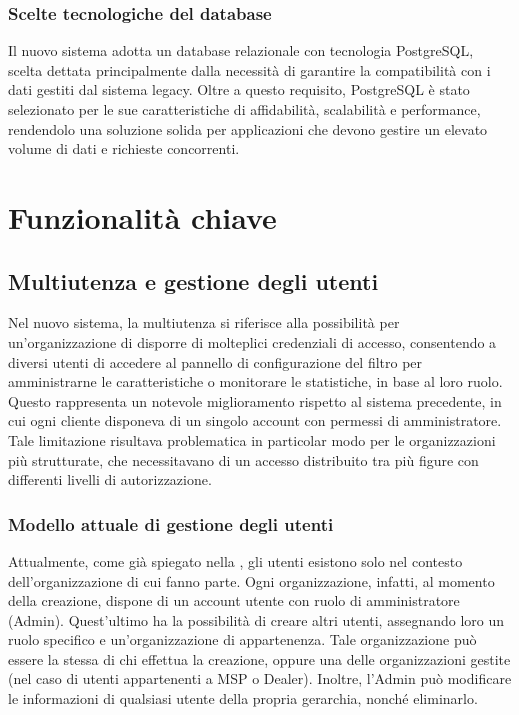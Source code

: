 \subsubsection{Scelte tecnologiche del database}
Il nuovo sistema adotta un database relazionale con tecnologia PostgreSQL, scelta dettata principalmente dalla necessità di garantire la compatibilità con i dati gestiti dal sistema legacy. Oltre a questo requisito, PostgreSQL è stato selezionato per le sue caratteristiche di affidabilità, scalabilità e performance, rendendolo una soluzione solida per applicazioni che devono gestire un elevato volume di dati e richieste concorrenti.

\section{Funzionalità chiave}
\subsection{Multiutenza e gestione degli utenti}
Nel nuovo sistema, la multiutenza si riferisce alla possibilità per un'organizzazione di disporre di molteplici credenziali di accesso, consentendo a diversi utenti di accedere al pannello di configurazione del filtro per amministrarne le caratteristiche o monitorare le statistiche, in base al loro ruolo. Questo rappresenta un notevole miglioramento rispetto al sistema precedente, in cui ogni cliente disponeva di un singolo account con permessi di amministratore. Tale limitazione risultava problematica in particolar modo per le organizzazioni più strutturate, che necessitavano di un accesso distribuito tra più figure con differenti livelli di autorizzazione.

\subsubsection{Modello attuale di gestione degli utenti}
Attualmente, come già spiegato nella , gli utenti esistono solo nel contesto dell'organizzazione di cui fanno parte. Ogni organizzazione, infatti, al momento della creazione, dispone di un account utente con ruolo di amministratore (Admin). Quest'ultimo ha la possibilità di creare altri utenti, assegnando loro un ruolo specifico e un'organizzazione di appartenenza. Tale organizzazione può essere la stessa di chi effettua la creazione, oppure una delle organizzazioni gestite (nel caso di utenti appartenenti a MSP o Dealer). Inoltre, l'Admin può modificare le informazioni di qualsiasi utente della propria gerarchia, nonché eliminarlo.

